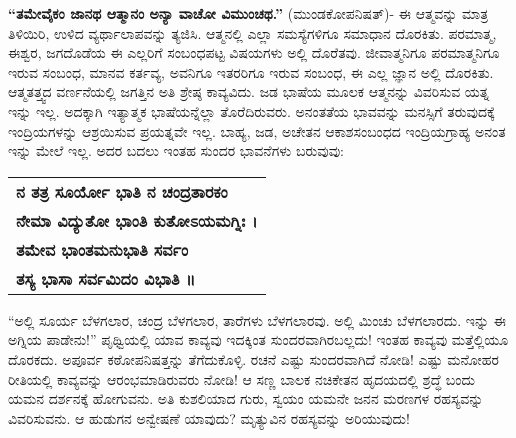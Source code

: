 \textbf{“ತಮೇವೈಕಂ ಜಾನಥ ಆತ್ಮಾನಂ ಅನ್ಯಾ ವಾಚೋ ವಿಮುಂಚಥ.”} (ಮುಂಡಕೋಪನಿಷತ್​)- ಈ ಆತ್ಮವನ್ನು ಮಾತ್ರ ತಿಳಿಯಿರಿ, ಉಳಿದ ವ್ಯರ್ಥಾಲಾಪವನ್ನು ತ್ಯಜಿಸಿ. ಆತ್ಮನಲ್ಲಿ ಎಲ್ಲಾ ಸಮಸ್ಯೆಗಳಿಗೂ ಸಮಾಧಾನ ದೊರಕಿತು. ಪರಮಾತ್ಮ, ಈಶ್ವರ, ಜಗದೊಡೆಯ ಈ ಎಲ್ಲರಿಗೆ ಸಂಬಂಧಪಟ್ಟ ವಿಷಯಗಳು ಅಲ್ಲಿ ದೊರೆತವು. ಜೀವಾತ್ಮನಿಗೂ ಪರಮಾತ್ಮನಿಗೂ ಇರುವ ಸಂಬಂಧ, ಮಾನವ ಕರ್ತವ್ಯ, ಅವನಿಗೂ ಇತರರಿಗೂ ಇರುವ ಸಂಬಂಧ, ಈ ಎಲ್ಲ ಜ್ಞಾನ ಅಲ್ಲಿ ದೊರಕಿತು. ಆತ್ಮತತ್ತ್ವದ ವರ್ಣನೆಯಲ್ಲಿ ಜಗತ್ತಿನ ಅತಿ ಶ್ರೇಷ್ಠ ಕಾವ್ಯವಿದು. ಜಡ ಭಾಷೆಯ ಮೂಲಕ ಆತ್ಮನನ್ನು ವಿವರಿಸುವ ಯತ್ನ ಇನ್ನು ಇಲ್ಲ. ಅದಕ್ಕಾಗಿ ಇತ್ಯಾತ್ಮಕ  ಭಾಷೆಯನ್ನೆಲ್ಲಾ ತೊರೆದಿರುವರು. ಅನಂತತೆಯ ಭಾವವನ್ನು ಮನಸ್ಸಿಗೆ ತರುವುದಕ್ಕೆ ಇಂದ್ರಿಯಗಳನ್ನು ಆಶ್ರಯಿಸುವ ಪ್ರಯತ್ನವೇ ಇಲ್ಲ. ಬಾಹ್ಯ, ಜಡ, ಅಚೇತನ ಆಕಾಶಸಂಬಂಧದ ಇಂದ್ರಿಯಗ್ರಾಹ್ಯ ಅನಂತ ಇನ್ನು ಮೇಲೆ ಇಲ್ಲ. ಅದರ ಬದಲು ಇಂತಹ ಸುಂದರ ಭಾವನೆಗಳು ಬರುವುವು:

\begin{longtable}[r]{@{}l@{}}
\textbf{ನ ತತ್ರ ಸೂರ್ಯೋ ಭಾತಿ ನ ಚಂದ್ರತಾರಕಂ} \\
\textbf{ನೇಮಾ ವಿದ್ಯುತೋ ಭಾಂತಿ ಕುತೋಽಯಮಗ್ನಿಃ ।} \\
\textbf{ತಮೇವ ಭಾಂತಮನುಭಾತಿ ಸರ್ವಂ} \\
\textbf{ತಸ್ಯ ಭಾಸಾ ಸರ್ವಮಿದಂ ವಿಭಾತಿ ॥} \\
\end{longtable}

“ಅಲ್ಲಿ ಸೂರ್ಯ ಬೆಳಗಲಾರ, ಚಂದ್ರ ಬೆಳಗಲಾರ, ತಾರೆಗಳು ಬೆಳಗಲಾರವು. ಅಲ್ಲಿ ಮಿಂಚು ಬೆಳಗಲಾರದು. ಇನ್ನು ಈ ಅಗ್ನಿಯ ಪಾಡೇನು!” ಪೃಥ್ವಿಯಲ್ಲಿ ಯಾವ ಕಾವ್ಯವು ಇದಕ್ಕಿಂತ ಸುಂದರವಾಗಿರಬಲ್ಲದು! ಇಂತಹ ಕಾವ್ಯವು ಮತ್ತೆಲ್ಲಿಯೂ ದೊರಕದು. ಅಪೂರ್ವ ಕಠೋಪನಿಷತ್ತನ್ನು ತೆಗೆದುಕೊಳ್ಳಿ. ರಚನೆ ಎಷ್ಟು ಸುಂದರವಾಗಿದೆ ನೋಡಿ! ಎಷ್ಟು ಮನೋಹರ ರೀತಿಯಲ್ಲಿ ಕಾವ್ಯವನ್ನು ಆರಂಭಮಾಡಿರುವರು ನೋಡಿ! ಆ ಸಣ್ಣ ಬಾಲಕ ನಚಿಕೇತನ ಹೃದಯದಲ್ಲಿ ಶ್ರದ್ಧೆ ಬಂದು ಯಮನ ದರ್ಶನಕ್ಕೆ ಹೋಗುವನು. ಅತಿ ಕುಶಲಿಯಾದ ಗುರು, ಸ್ವಯಂ ಯಮನೇ ಜನನ ಮರಣಗಳ ರಹಸ್ಯವನ್ನು ವಿವರಿಸುವನು. ಆ ಹುಡುಗನ ಅನ್ವೇಷಣೆ ಯಾವುದು? ಮೃತ್ಯುವಿನ ರಹಸ್ಯವನ್ನು ಅರಿಯುವುದು!

